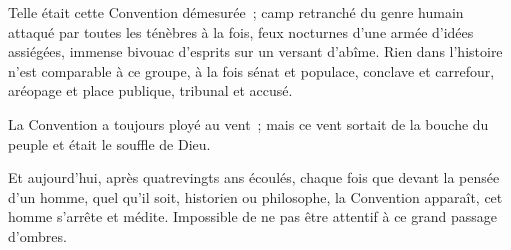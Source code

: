 \documentclass[french,twoside]{book} %
\def\mednobreak{\ifdim\lastskip<\medskipamount
  \removelastskip\nopagebreak\medskip\fi}
\newcommand{\labelblock}[1]{\medbreak{\noindent\color{rubric}\bfseries #1}\par\mednobreak}
\begin{document}
\labelblock{xii}

\noindent Telle était cette Convention démesurée ; camp retranché du genre humain attaqué par toutes les ténèbres à la fois, feux nocturnes d’une armée d’idées  assiégées, immense bivouac d’esprits sur un versant d’abîme. Rien dans l’histoire n’est comparable à ce groupe, à la fois sénat et populace, conclave et carrefour, aréopage et place publique, tribunal et accusé.\par
La Convention a toujours ployé au vent ; mais ce vent sortait de la bouche du peuple et était le souffle de Dieu.\par
Et aujourd’hui, après quatrevingts ans écoulés, chaque fois que devant la pensée d’un homme, quel qu’il soit, historien ou philosophe, la Convention apparaît, cet homme s’arrête et médite. Impossible de ne pas être attentif à ce grand passage d’ombres.
\end{document}
